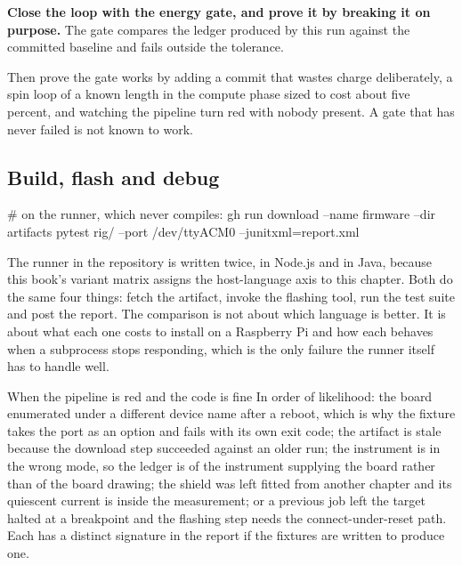 \begin{steps}
\item \textbf{Close the loop with the energy gate, and prove it by breaking it on
purpose.} The gate compares the ledger produced by this run against the
committed baseline and fails outside the tolerance.
Then prove the gate works by adding a commit that wastes charge deliberately, a
spin loop of a known length in the compute phase sized to cost about five
percent, and watching the pipeline turn red with nobody present. A gate that has
never failed is not known to work.
\end{steps}

\subsection*{Build, flash and debug}


\begin{shellcode}
# on the runner, which never compiles:
gh run download --name firmware --dir artifacts
pytest rig/ --port /dev/ttyACM0 --junitxml=report.xml
\end{shellcode}

The runner in the repository is written twice, in Node.js and in Java, because
this book's variant matrix assigns the host-language axis to this chapter. Both
do the same four things: fetch the artifact, invoke the flashing tool, run the
test suite and post the report. The comparison is not about which language is
better. It is about what each one costs to install on a Raspberry Pi and how
each behaves when a subprocess stops responding, which is the only failure the
runner itself has to handle well.

\begin{note}{When the pipeline is red and the code is fine}
In order of likelihood: the board enumerated under a different device name after
a reboot, which is why the fixture takes the port as an option and fails with
its own exit code; the artifact is stale because the download step succeeded
against an older run; the instrument is in the wrong mode, so the ledger is of
the instrument supplying the board rather than of the board drawing; the shield
was left fitted from another chapter and its quiescent current is inside the
measurement; or a previous job left the target halted at a breakpoint and the
flashing step needs the connect-under-reset path. Each has a distinct signature
in the report if the fixtures are written to produce one.
\end{note}

